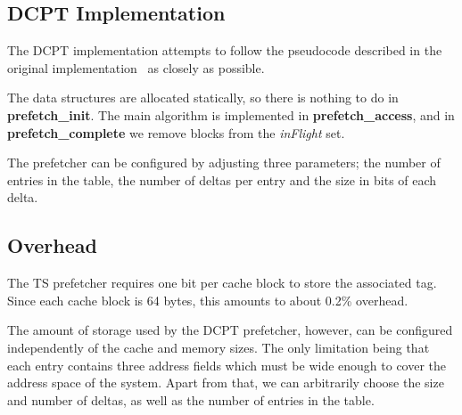 \subsection{DCPT Implementation}



The DCPT implementation attempts to follow the pseudocode described in the
original implementation~\cite{dcpt} as closely as possible.

The data structures are allocated statically, so there is nothing to do in
\textbf{prefetch\_init}. The main algorithm is implemented in
\textbf{prefetch\_access}, and in \textbf{prefetch\_complete} we remove blocks
from the \emph{inFlight} set.


The prefetcher can be configured by adjusting three parameters; the number of
entries in the table, the number of deltas per entry and the size in bits of
each delta.

\subsection{Overhead}

The TS prefetcher requires one bit per cache block to store the
associated tag. Since each cache block is 64 bytes, this amounts to about 0.2\%
overhead.

The amount of storage used by the DCPT prefetcher, however, can be configured
independently of the cache and memory sizes. The only limitation being that each
entry contains three address fields which must be wide enough to cover the
address space of the system. Apart from that, we can arbitrarily choose the size
and number of deltas, as well as the number of entries in the table.


